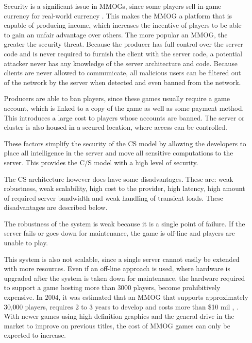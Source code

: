 \documentclass[journal,oneside,a4paper,onecolumn]{IEEEtran}
\begin{document}
Security is a significant issue in MMOGs, since some players sell in-game currency for real-world currency \cite{chinese_gold_farmer}. This makes the MMOG a platform that is capable of producing income, which increases the incentive of players to be able to gain an unfair advantage over others. The more popular an MMOG, the greater the security threat. Because the producer has full control over the server code and is never required to furnish the client with the server code, a potential attacker never has any knowledge of the server architecture and code. Because clients are never allowed to communicate, all malicious users can be filtered out of the network by the server when detected and even banned from the network.

Producers are able to ban players, since these games usually require a game account, which is linked to a copy of the game as well as some payment method. This introduces a large cost to players whose accounts are banned. The server or cluster is also housed in a secured location, where access can be controlled.

These factors simplify the security of the \ac{CS} model by allowing the developers to place all intelligence in the server and move all sensitive computations to the server. This provides the C/S model with a high level of security.

The \ac{CS} architecture however does have some disadvantages. These are: weak robustness, weak scalability, high cost to the provider, high latency, high amount of required server bandwidth and weak handling of transient loads. These disadvantages are described below.

The robustness of the system is weak because it is a single point of failure. If the server fails or goes down for maintenance, the game is off-line and players are unable to play.

This system is also not scalable, since a single server cannot easily be extended with more resources. Even if an off-line approach is used, where hardware is upgraded after the system is taken down for maintenance, the hardware required to support a game hosting more than 3000 players, become prohibitively expensive. In 2004, it was estimated that an MMOG that supports approximately 30,000 players, requires 2 to 3 years to develop and costs more than \$10 mil \cite{cs_mmog_cost}, \cite{igda_online_whitepaper}. With newer games using high definition graphics and the general drive in the market to improve on previous titles, the cost of MMOG games can only be expected to increase.
\end{document}
